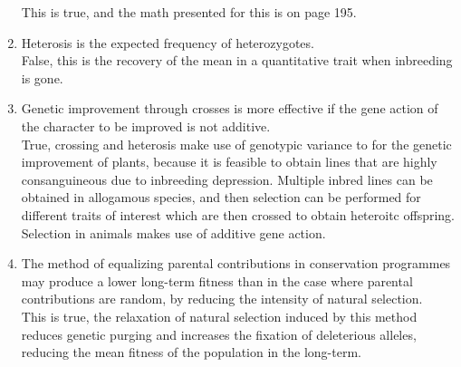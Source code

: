 \documentclass[12pt]{amsart}
\begin{document}
\begin{enumerate}
This is true, and the math presented for this is on page 195.\\
\item Heterosis is the expected frequency of heterozygotes.\\
False, this is the recovery of the mean in a quantitative trait when inbreeding is gone.\\
\item Genetic improvement through crosses is more effective if the gene action of the character to be improved is not additive.\\
True, crossing and heterosis make use of genotypic variance to for the genetic improvement of plants, because it is feasible to obtain lines that are highly consanguineous due to inbreeding depression. Multiple inbred lines can be obtained in allogamous species, and then selection can be performed for different traits of interest which are then crossed to obtain heteroitc offspring. Selection in animals makes use of additive gene action.\\
\item The method of equalizing parental contributions in conservation programmes may produce a lower long-term fitness than in the case where parental contributions are random, by reducing the intensity of natural selection. \\
This is true, the relaxation of natural selection induced by this method reduces genetic purging and increases the fixation of deleterious alleles, reducing the mean fitness of the population in the long-term.\\
\end{enumerate}


\medskip
\end{document}
